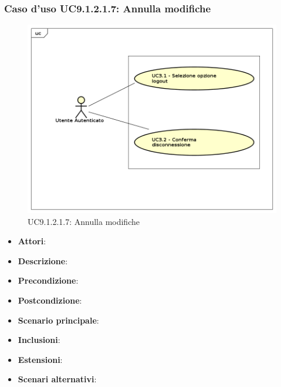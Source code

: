 					\subsubsection{Caso d'uso UC9.1.2.1.7: Annulla modifiche}
					\label{UC9.1.2.1.7}
					\begin{figure}[h]
						\centering
					\includegraphics[scale=0.7,keepaspectratio]{UML/UC9.png}
						\caption{UC9.1.2.1.7: Annulla modifiche}
					\end{figure}
					\FloatBarrier
					\begin{itemize}
						\item \textbf{Attori}: 
						\item \textbf{Descrizione}: 
						\item \textbf{Precondizione}: 
						\item \textbf{Postcondizione}: 
						\item \textbf{Scenario principale}:
						\item \textbf{Inclusioni}:
						\item \textbf{Estensioni}:
						\item \textbf{Scenari alternativi}:
					\end{itemize}
					
